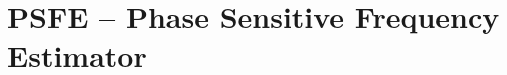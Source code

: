 \documentclass[12pt,a4paper,oneside]{report} %
\begin{document}
\section*{\infosection} %

\section*{\examplesection} %


\chapter{PSFE -- Phase Sensitive Frequency Estimator} %
\section*{\infosection} %

\section*{\examplesection} %




%
\end{document}
